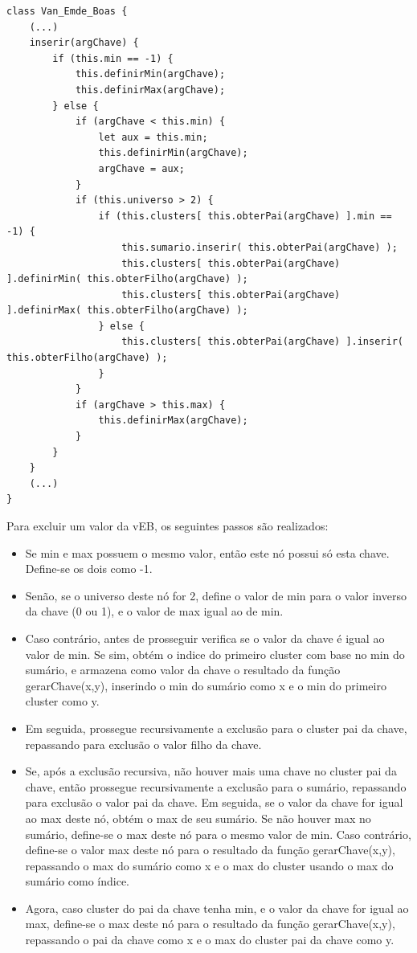 \documentclass[12pt]{article}
\begin{document}
\begin{verbatim}
class Van_Emde_Boas {
    (...)
    inserir(argChave) {
        if (this.min == -1) {
            this.definirMin(argChave);
            this.definirMax(argChave);
        } else {
            if (argChave < this.min) {
                let aux = this.min;
                this.definirMin(argChave);
                argChave = aux;
            }
            if (this.universo > 2) {
                if (this.clusters[ this.obterPai(argChave) ].min == -1) {
                    this.sumario.inserir( this.obterPai(argChave) );
                    this.clusters[ this.obterPai(argChave) ].definirMin( this.obterFilho(argChave) );
                    this.clusters[ this.obterPai(argChave) ].definirMax( this.obterFilho(argChave) );
                } else {
                    this.clusters[ this.obterPai(argChave) ].inserir( this.obterFilho(argChave) );
                }
            }
            if (argChave > this.max) {
                this.definirMax(argChave);
            }
        }
    }
    (...)
}
\end{verbatim}

Para excluir um valor da vEB, os seguintes passos são realizados:
\begin{itemize}
    \item Se min e max possuem o mesmo valor, então este nó possui só esta chave. Define-se os dois como -1.
    \item Senão, se o universo deste nó for 2, define o valor de min para o valor inverso da chave (0 ou 1), e o valor de max igual ao de min.
    \item Caso contrário, antes de prosseguir verifica se o valor da chave é igual ao valor de min. Se sim, obtém o indice do primeiro cluster com base no min do sumário, e armazena como valor da chave o resultado da função gerarChave(x,y), inserindo o min do sumário como x e o min do primeiro cluster como y.
    \item Em seguida, prossegue recursivamente a exclusão para o cluster pai da chave, repassando para exclusão o valor filho da chave.
    \item Se, após a exclusão recursiva, não houver mais uma chave no cluster pai da chave, então prossegue recursivamente a exclusão para o sumário, repassando para exclusão o valor pai da chave. Em seguida, se o valor da chave for igual ao max deste nó, obtém o max de seu sumário. Se não houver max no sumário, define-se o max deste nó para o mesmo valor de min. Caso contrário, define-se o valor max deste nó para o resultado da função gerarChave(x,y), repassando o max do sumário como x e o max do cluster usando o max do sumário como índice.
    \item Agora, caso cluster do pai da chave tenha min, e o valor da chave for igual ao max, define-se o max deste nó para o resultado da função gerarChave(x,y), repassando o pai da chave como x e o max do cluster pai da chave como y.
\end{itemize}
\end{document}
